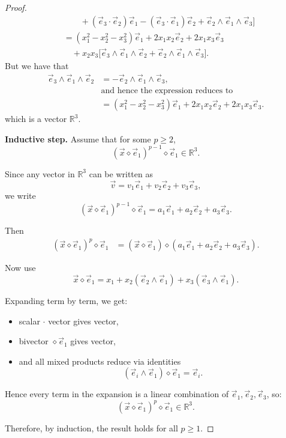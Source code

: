 \documentclass[10pt,a4paper]{amsart}
\begin{document}
\begin{proof}
\begin{align*}
&\qquad + \left( \vec{e}_{3}\cdot \vec{e}_{2} \right)\vec{e}_{1}
- \left( \vec{e}_{3}\cdot \vec{e}_{1} \right)\vec{e}_{2}
+ \vec{e}_{2}\wedge \vec{e}_{1}\wedge \vec{e}_{3}
\Big] \\[8pt]
&= \left( x_{1}^{2}-x_{2}^{2}-x_{3}^{2} \right)\vec{e}_{1}
+ 2x_{1}x_{2}\vec{e}_{2}
+ 2x_{1}x_{3}\vec{e}_{3} \\[6pt]
&\quad + x_{2}x_{3}
\Big[
\vec{e}_{3}\wedge \vec{e}_{1}\wedge \vec{e}_{2}
+ \vec{e}_{2}\wedge \vec{e}_{1}\wedge \vec{e}_{3}
\Big].
\end{align*}
But we have that
\begin{align*}
\vec{e}_{3} \wedge \vec{e}_{1} \wedge \vec{e}_{2}
&= - \vec{e}_{2} \wedge \vec{e}_{1} \wedge \vec{e}_{3}, \\[6pt]
&\text{and hence the expression reduces to } \\[6pt]
&= \left( x_{1}^{2}-x_{2}^{2}-x_{3}^{2} \right)\vec{e}_{1}
+ 2x_{1}x_{2}\vec{e}_{2}
+ 2x_{1}x_{3}\vec{e}_{3}.
\end{align*}
which is a vector $\mathbb{R}^3$.


\textbf{Inductive step.}
Assume that for some $p\ge 2$,
\[
(\vec x\diamond \vec e_1)^{p-1}\diamond \vec e_1 \in \mathbb{R}^3.
\]

Since any vector in $\mathbb{R}^3$ can be written as
\[
\vec v = v_1\vec e_1 + v_2\vec e_2 + v_3\vec e_3,
\]
we write
\[
(\vec x\diamond \vec e_1)^{p-1}\diamond \vec e_1
=
a_1\vec e_1 + a_2\vec e_2 + a_3\vec e_3.
\]

Then
\begin{align*}
(\vec x\diamond \vec e_1)^p\diamond \vec e_1
&=
(\vec x\diamond \vec e_1)\diamond (a_1\vec e_1 + a_2\vec e_2 + a_3\vec e_3).
\end{align*}

Now use
\[
\vec x\diamond \vec e_1
=
x_1 + x_2(\vec e_2\wedge \vec e_1) + x_3(\vec e_3\wedge \vec e_1).
\]

Expanding term by term, we get:
\begin{itemize}
\item  scalar $\cdot$ vector gives vector,
\item  bivector $\diamond \vec e_1$ gives vector,
\item  and all mixed products reduce via identities
\[
(\vec e_i\wedge \vec e_1)\diamond \vec e_1 = \vec e_i.
\]
\end{itemize}
Hence every term in the expansion is a linear combination of
$\vec e_1,\vec e_2,\vec e_3$, so:
\[
(\vec x\diamond \vec e_1)^p\diamond \vec e_1 \in \mathbb{R}^3.
\]

Therefore, by induction, the result holds for all $p\ge 1$.
\end{proof}
\end{document}

